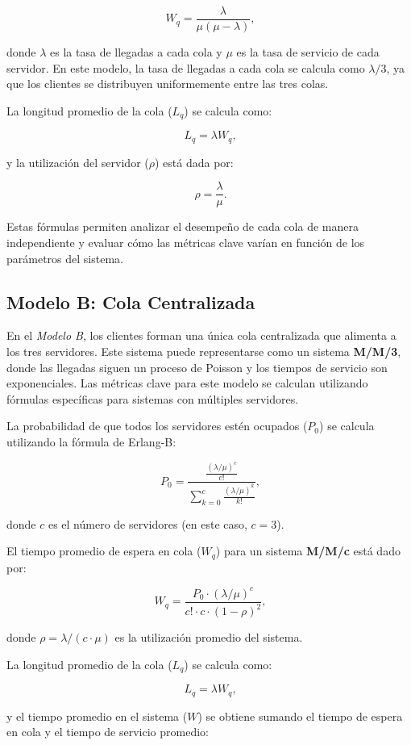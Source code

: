\documentclass[a4paper,12pt]{article}
\begin{document}
\[\
W_q = \frac{\lambda}{\mu (\mu - \lambda)},
\]

donde \( \lambda \) es la tasa de llegadas a cada cola y \( \mu \) es la tasa de servicio de cada servidor. En este modelo, la tasa de llegadas a cada cola se calcula como \( \lambda / 3 \), ya que los clientes se distribuyen uniformemente entre las tres colas.

La longitud promedio de la cola (\( L_q \)) se calcula como:

\[\
L_q = \lambda W_q,
\]

y la utilización del servidor (\( \rho \)) está dada por:

\[\
\rho = \frac{\lambda}{\mu}.
\]

Estas fórmulas permiten analizar el desempeño de cada cola de manera independiente y evaluar cómo las métricas clave varían en función de los parámetros del sistema.

\subsection{Modelo B: Cola Centralizada}

En el \textit{Modelo B}, los clientes forman una única cola centralizada que alimenta a los tres servidores. Este sistema puede representarse como un sistema \textbf{M/M/3}, donde las llegadas siguen un proceso de Poisson y los tiempos de servicio son exponenciales. Las métricas clave para este modelo se calculan utilizando fórmulas específicas para sistemas con múltiples servidores.

La probabilidad de que todos los servidores estén ocupados (\( P_0 \)) se calcula utilizando la fórmula de Erlang-B:

\[\
P_0 = \frac{\frac{(\lambda / \mu)^c}{c!}}{\sum_{k=0}^{c} \frac{(\lambda / \mu)^k}{k!}},
\]

donde \( c \) es el número de servidores (en este caso, \( c = 3 \)).

El tiempo promedio de espera en cola (\( W_q \)) para un sistema \textbf{M/M/c} está dado por:

\[\
W_q = \frac{P_0 \cdot (\lambda / \mu)^c}{c! \cdot c \cdot (1 - \rho)^2},
\]

donde \( \rho = \lambda / (c \cdot \mu) \) es la utilización promedio del sistema.

La longitud promedio de la cola (\( L_q \)) se calcula como:

\[\
L_q = \lambda W_q,
\]

y el tiempo promedio en el sistema (\( W \)) se obtiene sumando el tiempo de espera en cola y el tiempo de servicio promedio:
\end{document}
